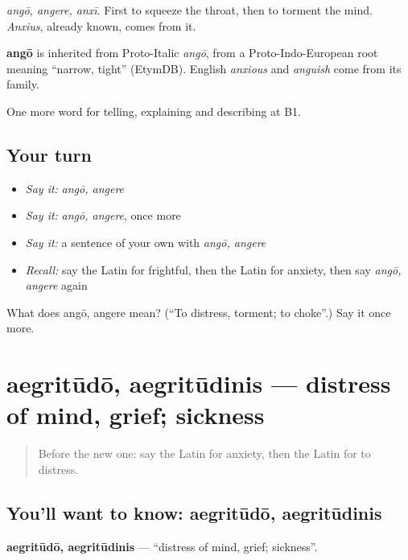 \emph{angō, angere, anxī}. First to squeeze the throat, then to torment the mind. \emph{Anxius}, already known, comes from it.

\begin{cousinweb}
\textbf{angō} is inherited from Proto-Italic \emph{angō}, from a Proto-Indo-European root meaning \textquotedblleft{}narrow, tight\textquotedblright{} (EtymDB). English \emph{anxious} and \emph{anguish} come from its family.
\end{cousinweb}

\begin{grammarlens}[title={What you've built}]
One more word for telling, explaining and describing at B1.
\end{grammarlens}

\subsection*{Your turn}
\begin{itemize}
\raggedright
  \item \emph{Say it:} \emph{angō, angere}
  \item \emph{Say it:} \emph{angō, angere}, once more
  \item \emph{Say it:} a sentence of your own with \emph{angō, angere}
  \item \emph{Recall:} say the Latin for frightful, then the Latin for anxiety, then say \emph{angō, angere} again
\end{itemize}

\begin{tcolorbox}[breakable,colback=teal!4,colframe=teal!35!black,title={Before you move on}]
What does angō, angere mean? (\textquotedblleft{}To distress, torment; to choke\textquotedblright{}.) Say it once more.
\end{tcolorbox}
\section[aegritūdō, aegritūdinis]{aegritūdō, aegritūdinis — distress of mind, grief; sickness}

\label{lesson:LA-C497-aegritudo}



\begin{quote}
Before the new one: say the Latin for anxiety, then the Latin for to distress.
\end{quote}

\subsection*{You'll want to know: aegritūdō, aegritūdinis}
\textbf{aegritūdō, aegritūdinis} — \textquotedblleft{}distress of mind, grief; sickness\textquotedblright{}.

